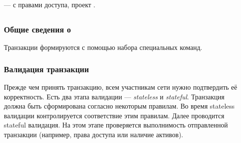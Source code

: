 \subsubsection{}
 ---  с правами доступа, проект .

\subsection{}
\subsubsection{Общие сведения о }
Транзакции формируются с помощью набора специальных команд.

\subsubsection{Валидация транзакции}
Прежде чем принять транзакцию, всем участникам сети нужно подтвердить её корректность.
Есть два этапа валидации --- \emph{stateless} и \emph{sta\-te\-ful}.
Транзакция должна быть сформирована согласно некоторым правилам.
Во время stateless валидации контролируется соответствие этим правилам.
Далее проводится stateful валидация. 
На этом этапе проверяется выполнимость отправленной транзакции (например, права доступа или наличие активов). 






